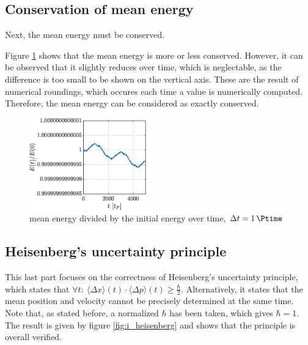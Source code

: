 \documentclass[a4paper,12pt,twoside]{article}
\begin{document}
  \subsection{Conservation of mean energy}
    Next, the mean energy must be conserved.

    Figure \ref{fig:i_E} shows that the mean energy is more or less conserved.
    However, it can be observed that it slightly reduces over time, which is neglectable, as the difference is too small to be shown on the vertical axis.
    These are the result of numerical roundings, which occures each time a value is numerically computed.
    Therefore, the mean energy can be considered as exactly conserved.

    \begin{figure}[h]
      \centering
      \includegraphics[width=0.45\textwidth]{graphs/i_E.eps}
      \caption{mean energy divided by the initial energy over time, $\Delta t = \SI{1}{\Ptime}$}
      \label{fig:i_E}
    \end{figure}

  \subsection{Heisenberg's uncertainty principle}
    This last part focuses on the correctness of Heisenberg's uncertainty principle, which states that $\forall t:~\langle \Delta x \rangle(t)\cdot\langle \Delta p \rangle(t) \geq \frac{\hbar}{2}$.
    Alternatively, it states that the mean position and velocity cannot be precisely determined at the same time.
    Note that, as stated before, a normalized $\hbar$ has been taken, which gives $\hbar=1$.\\ %

    The result is given by figure \ref{fig:i_heisenberg} and shows that the principle is overall verified.
\end{document}
